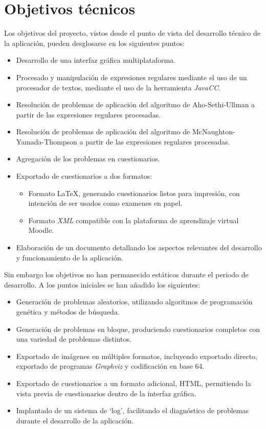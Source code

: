 
\section{Objetivos técnicos}
Los objetivos del proyecto, vistos desde el punto de vista del desarrollo técnico de la aplicación, pueden desglosarse en los siguientes puntos:
\begin{itemize}
	\item Desarrollo de una interfaz gráfica multiplataforma.
	\item Procesado y manipulación de expresiones regulares mediante el uso de un procesador de textos, mediante el uso de la herramienta \emph{JavaCC}.
	\item Resolución de problemas de aplicación del algoritmo de Aho-Sethi-Ullman a partir de las expresiones regulares procesadas.
	\item Resolución de problemas de aplicación del algoritmo de McNaughton-Yamada-Thompson a partir de las expresiones regulares procesadas.
	\item Agregación de los problemas en cuestionarios.
	\item Exportado de cuestionarios a dos formatos:
	\begin{itemize}
		\item Formato \LaTeX{}, generando cuestionarios listos para impresión, con intención de ser usados como examenes en papel.
		\item Formato \emph{XML} compatible con la plataforma de aprendizaje virtual Moodle.
	\end{itemize}
	\item Elaboración de un documento detallando los aspectos relevantes del desarrollo y funcionamiento de la aplicación.
\end{itemize}

Sin embargo los objetivos no han permanecido estáticos durante el periodo de desarrollo.
A los puntos iniciales se han añadido los siguientes:
\begin{itemize}
	\item Generación de problemas aleatorios, utilizando algoritmos de programación genética y métodos de búsqueda.
	\item Generación de problemas en bloque, produciendo cuestionarios completos con una variedad de problemas distintos.
	\item Exportado de imágenes en múltiples formatos, incluyendo exportado directo, exportado de programas \emph{Graphviz} y codificación en base 64.
	\item Exportado de cuestionarios a un formato adicional, HTML, permitiendo la vista previa de cuestionarios dentro de la interfaz gráfica.
	\item Implantado de un sistema de `log', facilitando el diagnóstico de problemas durante el desarrollo de la aplicación.
\end{itemize}

